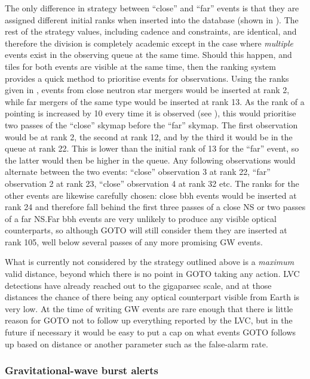 \begin{colsection}
\begin{colsection}
The only difference in strategy between ``close'' and ``far'' events is that they are assigned different initial ranks when inserted into the database (shown in ). The rest of the strategy values, including cadence and constraints, are identical, and therefore the division is completely academic except in the case where \emph{multiple} events exist in the observing queue at the same time. Should this happen, and tiles for both events are visible at the same time, then the ranking system provides a quick method to prioritise events for observations. Using the ranks given in , events from close neutron star mergers would be inserted at rank 2, while far mergers of the same type would be inserted at rank 13. As the rank of a pointing is increased by 10 every time it is observed (see ), this would prioritise two passes of the ``close'' skymap before the ``far'' skymap. The first observation would be at rank 2, the second at rank 12, and by the third it would be in the queue at rank 22. This is lower than the initial rank of 13 for the ``far'' event, so the latter would then be higher in the queue. Any following observations would alternate between the two events: ``close'' observation 3 at rank 22, ``far'' observation 2 at rank 23, ``close'' observation 4 at rank 32 etc. The ranks for the other events are likewise carefully chosen: close \gls{bbh} events would be inserted at rank 24 and therefore fall behind the first three passes of a close NS or two passes of a far NS.\@ Far \gls{bbh} events are very unlikely to produce any visible optical counterparts, so although GOTO will still consider them they are inserted at rank 105, well below several passes of any more promising GW events.

What is currently not considered by the strategy outlined above is a \textit{maximum} valid distance, beyond which there is no point in GOTO taking any action. LVC detections have already reached out to the gigaparsec scale, and at those distances the chance of there being any optical counterpart visible from Earth is very low. At the time of writing GW events are rare enough that there is little reason for GOTO not to follow up everything reported by the LVC, but in the future if necessary it would be easy to put a cap on what events GOTO follows up based on distance or another parameter such as the false-alarm rate.

\newpage

\subsubsection{Gravitational-wave burst alerts}


\end{colsection}
\end{colsection}
